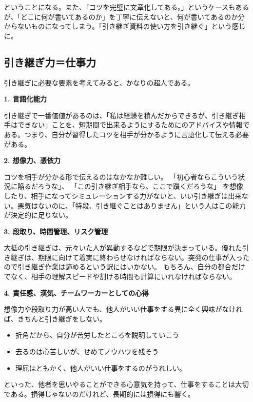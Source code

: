 \documentclass[letterpaper,10pt,dvipdfmx]{sphinxmanual}
\begin{document}
ということになる。また、「コツを完璧に文章化してある。」というケースもあるが、「どこに何が書いてあるのか」を丁寧に伝えないと、何が書いてあるのか分からないものになってしまう。「引き継ぎ資料の使い方を引き継ぐ」という感じに。


\subsection{引き継ぎ力＝仕事力}
\label{tips:id5}
引き継ぎに必要な要素を考えてみると、かなりの超人である。

\textbf{1. 言語化能力}

引き継ぎで一番価値があるのは、「私は経験を積んだからできるが、引き継ぎ相手はできない」ことを、短期間で出来るようにするためにのアドバイスや情報である。つまり、自分が習得したコツを相手が分かるように言語化して伝える必要がある。

\textbf{2. 想像力、憑依力}

コツを相手が分かる形で伝えるのはなかなか難しい。
「初心者ならこういう状況に陥るだろうな」、
「この引き継ぎ相手なら、ここで躓くだろうな」
を想像したり、相手になってシミュレーションする力がないと、いい引き継ぎは出来ない。悪気はないのに、「特段、引き継ぐことはありません」という人はこの能力が決定的に足りない。

\textbf{3. 段取り、時間管理、リスク管理}

大抵の引き継ぎは、元々いた人が異動するなどで期限が決まっている。優れた引き継ぎは、期限に向けて着実に終わらせなければならない。突発の仕事が入ったので引き継ぎ作業は諦めるという訳にはいかない。
もちろん、自分の都合だけでなく、相手の理解スピードや割ける時間も計算にいれなければならない。

\textbf{4. 責任感、漢気、チームワーカーとしての心得}

想像力や段取り力が高い人でも、他人がいい仕事をする異に全く興味がなければ、きちんと引き継ぎをしない。
\begin{itemize}
\item {} 
折角だから、自分が苦労したところを説明していこう

\item {} 
去るのは心苦しいが、せめてノウハウを残そう

\item {} 
理屈はともかく、他人がいい仕事をするのがうれしい。

\end{itemize}

といった、他者を思いやることができる心意気を持って、仕事をすることは大切である。損得じゃないのだけれど、長期的には損得にも響く。
\end{document}
